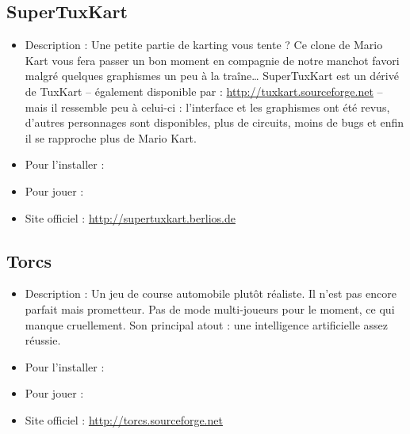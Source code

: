 \subsection{SuperTuxKart}
\begin{itemize}
\begingroup
{}
\item Description : Une petite partie de karting vous tente ? Ce clone de Mario Kart vous fera passer un bon moment en compagnie de notre manchot favori malgré quelques graphismes un peu à la traîne\ldots{} SuperTuxKart est un dérivé de TuxKart -- également disponible par  :  \url{http://tuxkart.sourceforge.net} -- mais il ressemble peu à celui-ci : l'interface et les graphismes ont été revus, d'autres personnages sont disponibles, plus de circuits, moins de bugs et enfin il se rapproche plus de Mario Kart.{\par}
\endgroup
\item Pour l'installer : 
\item Pour jouer : 
\item Site officiel : \url{http://supertuxkart.berlios.de}{\par}
\end{itemize}
\subsection{Torcs}
\begin{itemize}
\begingroup
{}
\item Description : Un jeu de course automobile plutôt réaliste. Il n'est pas encore parfait mais prometteur. Pas de mode multi-joueurs pour le moment, ce qui manque cruellement. Son principal atout : une intelligence artificielle assez réussie.{\par}
\item Pour l'installer : 
\item Pour jouer : 
\item Site officiel : \url{http://torcs.sourceforge.net}{\par}
\endgroup
\end{itemize}
